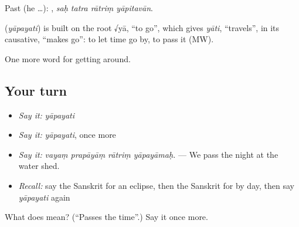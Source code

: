Past (he …):    , \emph{saḥ tatra rātriṃ yāpitavān}.

\begin{cousinweb}
\textbf{} (\emph{yāpayati}) is built on the root √yā, \textquotedblleft{}to go\textquotedblright{}, which gives \emph{yāti}, \textquotedblleft{}travels\textquotedblright{}, in its causative, \textquotedblleft{}makes go\textquotedblright{}: to let time go by, to pass it (MW).
\end{cousinweb}

\begin{grammarlens}[title={What you've built}]
One more word for getting around.
\end{grammarlens}

\subsection*{Your turn}
\begin{itemize}
\raggedright
  \item \emph{Say it:} \emph{yāpayati}
  \item \emph{Say it:} \emph{yāpayati}, once more
  \item \emph{Say it:} \emph{vayaṃ prapāyāṃ rātriṃ yāpayāmaḥ.} — We pass the night at the water shed.
  \item \emph{Recall:} say the Sanskrit for an eclipse, then the Sanskrit for by day, then say \emph{yāpayati} again
\end{itemize}

\begin{tcolorbox}[breakable,colback=teal!4,colframe=teal!35!black,title={Before you move on}]
What does  mean? (\textquotedblleft{}Passes the time\textquotedblright{}.) Say it once more.
\end{tcolorbox}
